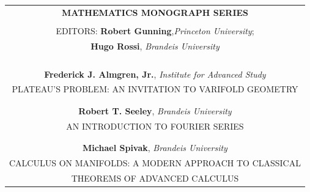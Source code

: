 \thispagestyle{empty}
\vspace*{\fill}
\begin{center}
    \begin{tabular}{c}
        \textbf{MATHEMATICS MONOGRAPH SERIES} \\\\
        EDITORS: \textbf{Robert Gunning},\textit{Princeton University};\\
        \textbf{Hugo Rossi}, \textit{Brandeis University}
        \\\\\\\\\\
        \textbf{Frederick J. Almgren, Jr.}, \textit{Institute for Advanced Study}\\
        PLATEAU'S PROBLEM: AN INVITATION TO VARIFOLD GEOMETRY\\
        \\\\
        \textbf{Robert T. Seeley}, \textit{Brandeis University}\\
        AN INTRODUCTION TO FOURIER SERIES\\
        \\\\
        \textbf{Michael Spivak}, \textit{Brandeis University}\\
        CALCULUS ON MANIFOLDS: A MODERN APPROACH TO CLASSICAL\\
        THEOREMS OF ADVANCED CALCULUS
    \end{tabular}
\end{center}
\vspace*{\fill}
\newpage


